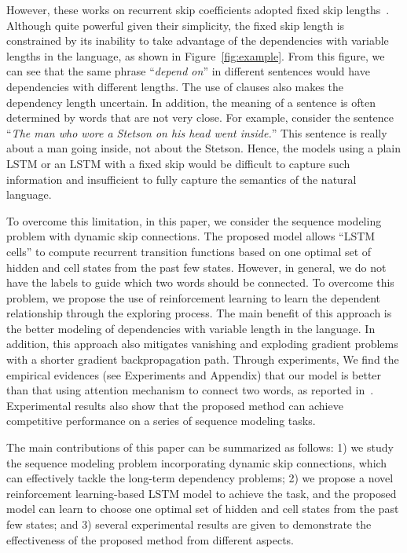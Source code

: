 \documentclass[letterpaper]{article} \usepackage{aaai19}  \usepackage{times}  \usepackage{helvet}  \usepackage{courier}  \usepackage{url}  \usepackage{graphicx}  \usepackage{amsmath}
\begin{document}
However, these works on recurrent skip coefficients adopted fixed skip lengths~\cite{zhang2016architectural,chang2017dilated}. Although quite powerful given their simplicity, the fixed skip length is constrained by its inability to take advantage of the dependencies with variable lengths in the language, as shown in Figure~\ref{fig:example}. From this figure, we can see that the same phrase ``\textit{depend on}'' in different sentences would have dependencies with different lengths. The use of clauses also makes the dependency length uncertain. In addition, the meaning of a sentence is often determined by words that are not very close. For example, consider the sentence ``\textit{The man who wore a Stetson on his head went inside.}'' This sentence is really about a man going inside, not about the Stetson. Hence, the models using a plain LSTM or an LSTM with a fixed skip would be difficult to capture such information and insufficient to fully capture the semantics of the natural language.

To overcome this limitation, in this paper, we consider the sequence modeling problem with dynamic skip connections. The proposed model allows ``LSTM cells'' to compute recurrent transition functions based on one optimal set of hidden and cell states from the past few states. However, in general, we do not have the labels to guide which two words should be connected. To overcome this problem, we propose the use of reinforcement learning to learn the dependent relationship through the exploring process. The main benefit of this approach is the better modeling of dependencies with variable length in the language. In addition, this approach also mitigates vanishing and exploding gradient problems with a shorter gradient backpropagation path. Through experiments, We find the empirical evidences (see Experiments and Appendix) that our model is better than that using attention mechanism to connect two words, as reported in~\cite{deng2018latent}. Experimental results also show that the proposed method can achieve competitive performance on a series of sequence modeling tasks.

The main contributions of this paper can be summarized as follows: 1) we study the sequence modeling problem incorporating dynamic skip connections, which can effectively tackle the long-term dependency problems; 2) we propose a novel reinforcement learning-based LSTM model to achieve the task, and the proposed model can learn to choose one optimal set of hidden and cell states from the past few states; and 3) several experimental results are given to demonstrate the effectiveness of the proposed method from different aspects.
\end{document}
